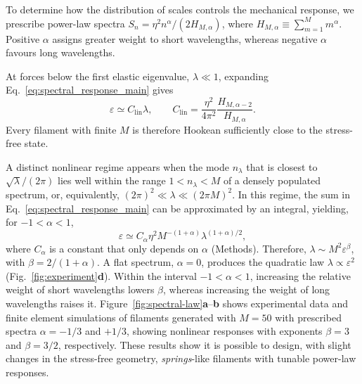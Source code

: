 \documentclass[pdflatex, twocolumn, sn-nature]{sn-jnl}
\begin{document}
To determine how the distribution of scales controls the mechanical response, we prescribe power-law spectra $S_n = \eta^2
n^\alpha/(2H_{M,\alpha})$, where $H_{M,\alpha}
\equiv
\sum_{m=1}^{M}m^\alpha$.
Positive $\alpha$ assigns greater weight to short wavelengths, whereas negative $\alpha$ favours long wavelengths.

At forces below the first elastic eigenvalue, $\lambda\ll 1$, expanding Eq.~\eqref{eq:spectral_response_main} gives
\begin{equation}
\varepsilon
\simeq
C_{\mathrm{lin}}\lambda,
\qquad
C_{\mathrm{lin}}
=
\frac{\eta^2}{4\pi^2}
\frac{H_{M,\alpha-2}}{H_{M,\alpha}} .
\label{eq:linear_main}
\end{equation}
Every filament with finite $M$ is therefore Hookean sufficiently close to the stress-free state.

A distinct nonlinear regime appears when the mode $n_\lambda$ that is closest to $\sqrt{\lambda}/(2\pi)$ lies well within the range $1 < n_\lambda < M$ of a densely populated spectrum, or, equivalently, $(2\pi)^2 \ll \lambda \ll (2\pi M)^2$.
In this regime, the sum in Eq.~\eqref{eq:spectral_response_main} can be approximated by an integral, yielding, for $-1<\alpha<1$, 
\begin{equation}
\varepsilon
\simeq
C_\alpha
\eta^2
M^{-(1+\alpha)}
\lambda^{(1+\alpha)/2},
\label{eq:nonlinear_main}
\end{equation}
where $C_\alpha$ is a constant that only depends on $\alpha$ (Methods).
Therefore, $\lambda \sim M^2 \varepsilon^\beta$, with $\beta= 2/(1+\alpha)$.
A flat spectrum, $\alpha=0$, produces the quadratic law $\lambda\propto\varepsilon^2$ (Fig.~\ref{fig:experiment}\textbf{d}). Within the interval $-1<\alpha<1$, increasing the relative weight of short wavelengths lowers $\beta$, whereas increasing the weight of long wavelengths raises it.
Figure~\ref{fig:spectral-law}\textbf{a}--\textbf{b} shows experimental data and finite element simulations of filaments  generated with $M=50$ with prescribed spectra $\alpha=-1/3$ and $+1/3$, showing nonlinear responses with exponents $\beta=3$ and $\beta=3/2$, respectively. 
These results show it is possible to design, with slight changes in the stress-free geometry, \textit{springs}-like filaments with tunable power-law responses.
\end{document}
